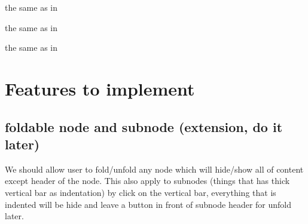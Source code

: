 \documentclass[11pt, a4paper]{article}
\begin{document}
 {
    the same as in 
}

 {
    the same as in 
}

 {
    the same as in 
}




\section{Features to implement}

\subsection{foldable node and subnode (extension, do it later)}

We should allow user to fold/unfold any node which will hide/show all of content except header of the node. This also apply to subnodes (things that has thick vertical bar as indentation) by click on the vertical bar, everything that is indented will be hide and leave a button in front of subnode header for unfold later.
\end{document}
